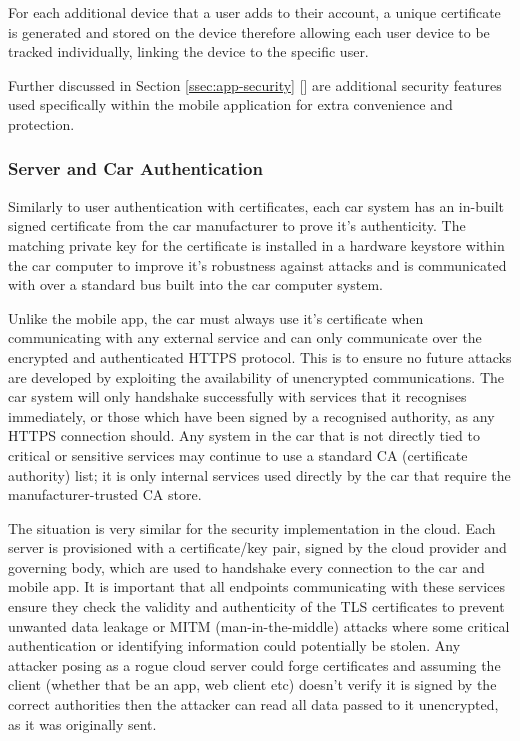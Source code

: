 \documentclass{article}
\begin{document}
For each additional device that a user adds to their account, a unique certificate is generated and stored on the device therefore allowing each user device to be tracked individually, linking the device to the specific user. 

Further discussed in Section \ref{ssec:app-security} [] are additional security features used specifically within the mobile application for extra convenience and protection.

\subsubsection{Server and Car Authentication}
Similarly to user authentication with certificates, each car system has an in-built signed certificate from the car manufacturer to prove it's authenticity. The matching private key for the certificate is installed in a hardware keystore within the car computer to improve it's robustness against attacks and is communicated with over a standard bus built into the car computer system.

Unlike the mobile app, the car must always use it's certificate when communicating with any external service and can only communicate over the encrypted and authenticated HTTPS protocol. This is to ensure no future attacks are developed by exploiting the availability of unencrypted communications.
The car system will only handshake successfully with services that it recognises immediately, or those which have been signed by a recognised authority, as any HTTPS connection should.
Any system in the car that is not directly tied to critical or sensitive services may continue to use a standard CA (certificate authority) list; it is only internal services used directly by the car that require the manufacturer-trusted CA store.

The situation is very similar for the security implementation in the cloud. Each server is provisioned with a certificate/key pair, signed by the cloud provider and governing body, which are used to handshake every connection to the car and mobile app.
It is important that all endpoints communicating with these services ensure they check the validity and authenticity of the TLS certificates to prevent unwanted data leakage or MITM (man-in-the-middle) attacks where some critical authentication or identifying information could potentially be stolen. Any attacker posing as a rogue cloud server could forge certificates and assuming the client (whether that be an app, web client etc) doesn't verify it is signed by the correct authorities then the attacker can read all data passed to it unencrypted, as it was originally sent.
\end{document}

